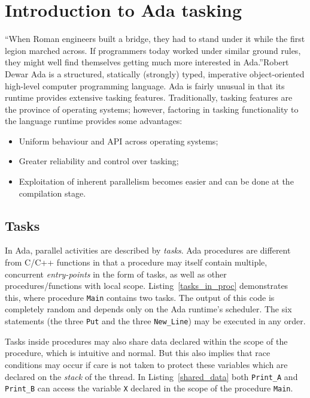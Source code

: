 \chapter{Introduction to Ada tasking}{``When Roman engineers built a
  bridge, they had to stand under it while the first legion marched
  across. If programmers today worked under similar ground rules, they
  might well find themselves getting much more interested in
  Ada.''}{Robert Dewar}
\label{chap:intro_ada}
Ada is a structured, statically (strongly) typed, imperative
object-oriented high-level computer programming language.  Ada is
fairly unusual in that its runtime provides extensive tasking
features. Traditionally, tasking features are the province of
operating systems; however, factoring in tasking functionality to the
language runtime provides some advantages:

\begin{itemize}
\item{Uniform behaviour and API across operating systems;}
\item{Greater reliability and control over tasking;}
\item{Exploitation of inherent parallelism becomes easier and can be
  done at the compilation stage.}
\end{itemize}

\section{Tasks}
In Ada, parallel activities are described by \emph{tasks}. Ada
procedures are different from C/C++ functions in that a procedure may
itself contain multiple, concurrent \emph{entry-points} in the form of
tasks, as well as other procedures/functions with local
scope. Listing~\ref{tasks_in_proc} demonstrates this, where procedure
\texttt{Main} contains two tasks. The output of this code is
completely random and depends only on the Ada runtime's scheduler. The
six statements (the three \texttt{Put} and the three
\texttt{New\_Line}) may be executed in any order.

Tasks inside procedures may also share data declared within the scope
of the procedure, which is intuitive and normal. But this also implies
that race conditions may occur if care is not taken to protect these
variables which are declared on the \emph{stack} of the thread. In
Listing~\ref{shared_data} both \texttt{Print\_A} and \texttt{Print\_B}
can access the variable \texttt{X} declared in the scope of the
procedure \texttt{Main}.

